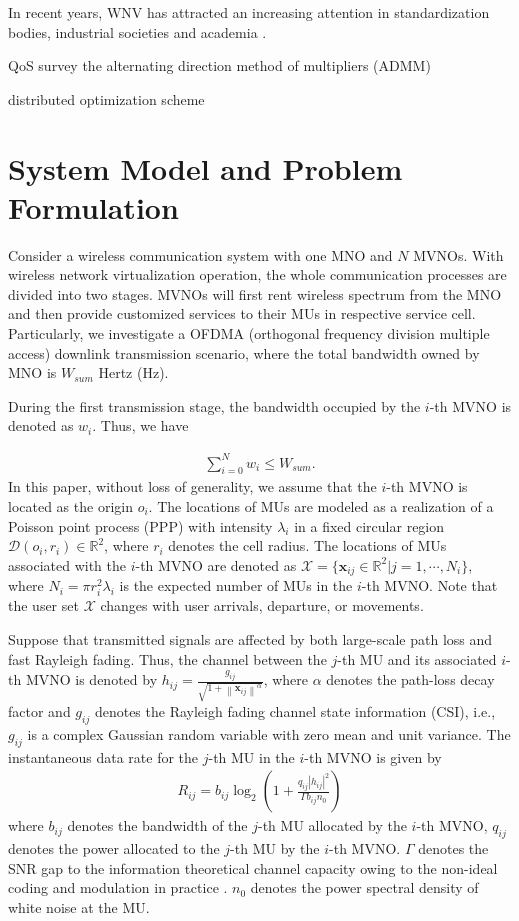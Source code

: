 \documentclass[journal]{IEEEtran}
\begin{document}
In recent years, WNV has attracted an increasing attention in standardization bodies, industrial societies and academia \cite{LZhao,3GPP,XCostaPerez,MIKamel,MKalil,YXZhang1,YXZhang2}.

QoS  survey the alternating direction method of multipliers (ADMM)

distributed optimization scheme 
\section{System Model and Problem Formulation}

Consider a wireless communication system with one MNO and $N$ MVNOs. With wireless network virtualization operation, the whole communication processes are divided into two stages. MVNOs will first rent wireless spectrum from the MNO and then provide customized services to their MUs in respective service cell. Particularly, we investigate a OFDMA (orthogonal frequency division multiple access) downlink transmission scenario, where the total bandwidth owned by MNO is $W_{sum}$ Hertz (Hz). 

During the first transmission stage, the bandwidth occupied by the $i$-th MVNO is denoted as $w_i$. Thus, we have

\begin{align}
\sum_{i = 0}^{N} w_i \leq W_{sum}.
\end{align}
In this paper, without loss of generality, we assume that the $i$-th MVNO is located as the origin $o_i$. The locations of MUs are modeled as a realization of a Poisson point process (PPP) with intensity $\lambda_i$ in a fixed circular region $\mathcal{D}(o_i, r_i) \in \mathbb{R}^2$, where $r_i$ denotes the cell radius. The locations of MUs associated with the $i$-th MVNO are denoted as $\mathcal{X} = \{\mathbf{x}_{ij} \in \mathbb{R}^2 | j = 1, \cdots, N_i\}$, where $N_i = \pi r_i^2 \lambda_i$ is the expected number of MUs in the $i$-th MVNO. Note that the user set $\mathcal{X}$ changes with user arrivals, departure, or movements.

Suppose that transmitted signals are affected by both large-scale path loss and fast Rayleigh fading. Thus, the channel between the $j$-th MU and its associated $i$-th MVNO is denoted by $h_{ij} = \frac{g_{ij}}{\sqrt{1 + {\left\| \mathbf{x}_{ij} \right\|}^\alpha}}$, where $\alpha$ denotes the path-loss decay factor  and $g_{ij}$ denotes the Rayleigh fading channel state information (CSI), i.e., $g_{ij}$ is a complex Gaussian random variable with zero mean and unit variance. The instantaneous data rate for the $j$-th MU in the $i$-th MVNO is given by
\begin{align}
	R_{ij} = b_{ij}\log_2\left(1 + \frac{q_{ij} \left|h_{ij} \right|^2 }{\Gamma b_{ij}n_0}\right)
\end{align}
where $b_{ij}$ denotes the bandwidth of the $j$-th MU allocated by the $i$-th MVNO, $q_{ij}$ denotes the power allocated to the $j$-th MU by the $i$-th MVNO. $\Gamma$ denotes the SNR gap to the information theoretical channel capacity owing to the
non-ideal coding and modulation in practice \cite{JGDForney}. $n_0$ denotes the power spectral density of white noise at the MU.    
                  
\end{document}
